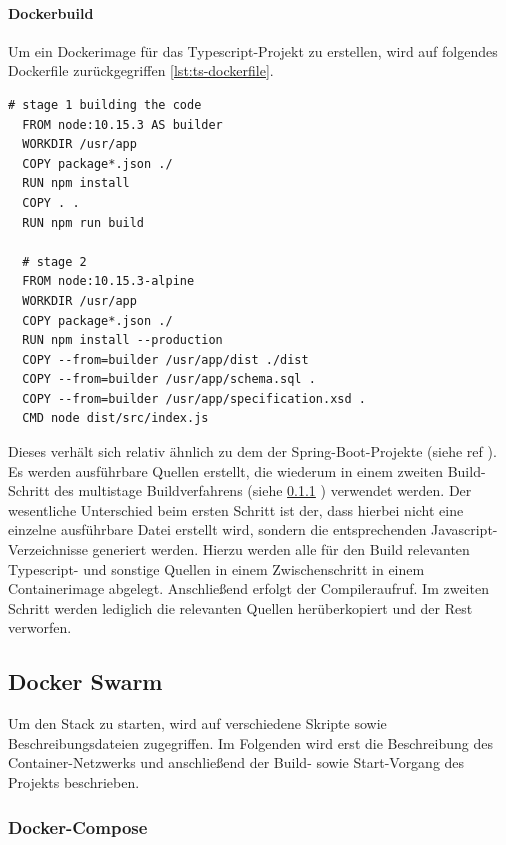 \paragraph{Dockerbuild \checkmark}
Um ein Dockerimage für das Typescript-Projekt zu erstellen, wird auf folgendes Dockerfile zurückgegriffen \ref{lst:ts-dockerfile}.

\begin{lstlisting}[style=bashStyle,caption={Dockerfile - Typescript Projekt},label=lst:ts-dockerfile]
  # stage 1 building the code
  FROM node:10.15.3 AS builder
  WORKDIR /usr/app
  COPY package*.json ./
  RUN npm install
  COPY . .
  RUN npm run build 

  # stage 2
  FROM node:10.15.3-alpine
  WORKDIR /usr/app
  COPY package*.json ./
  RUN npm install --production
  COPY --from=builder /usr/app/dist ./dist
  COPY --from=builder /usr/app/schema.sql .
  COPY --from=builder /usr/app/specification.xsd .
  CMD node dist/src/index.js
\end{lstlisting}

Dieses verhält sich relativ ähnlich zu dem der Spring-Boot-Projekte (siehe ref{} ). Es werden ausführbare Quellen erstellt, die wiederum in einem zweiten Build-Schritt des multistage Buildverfahrens (siehe \ref{} ) verwendet werden. Der wesentliche Unterschied beim ersten Schritt ist der, dass hierbei nicht eine einzelne ausführbare Datei erstellt wird, sondern die entsprechenden Javascript-Verzeichnisse generiert werden. Hierzu werden alle für den Build relevanten Typescript- und sonstige Quellen in einem Zwischenschritt in einem Containerimage abgelegt. Anschließend erfolgt der Compileraufruf. Im zweiten Schritt werden lediglich die relevanten Quellen herüberkopiert und der Rest verworfen. 


\subsection{Docker Swarm \checkmark}
Um den Stack zu starten, wird auf verschiedene Skripte sowie Beschreibungsdateien zugegriffen. Im Folgenden wird erst die Beschreibung des Container-Netzwerks und anschließend der Build- sowie Start-Vorgang des Projekts beschrieben.

\subsubsection{Docker-Compose \checkmark}
